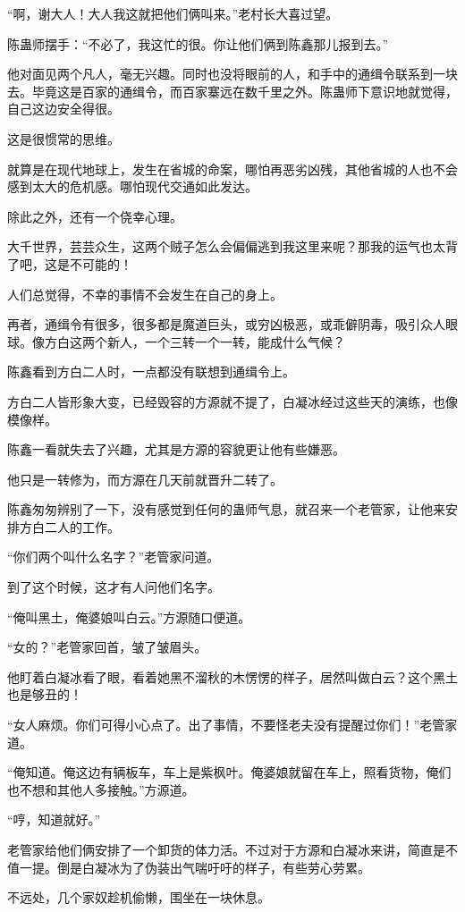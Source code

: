 \begin{this_body}
“啊，谢大人！大人我这就把他们俩叫来。”老村长大喜过望。

陈蛊师摆手：“不必了，我这忙的很。你让他们俩到陈鑫那儿报到去。”

他对面见两个凡人，毫无兴趣。同时也没将眼前的人，和手中的通缉令联系到一块去。毕竟这是百家的通缉令，而百家寨远在数千里之外。陈蛊师下意识地就觉得，自己这边安全得很。

这是很惯常的思维。

就算是在现代地球上，发生在省城的命案，哪怕再恶劣凶残，其他省城的人也不会感到太大的危机感。哪怕现代交通如此发达。

除此之外，还有一个侥幸心理。

大千世界，芸芸众生，这两个贼子怎么会偏偏逃到我这里来呢？那我的运气也太背了吧，这是不可能的！

人们总觉得，不幸的事情不会发生在自己的身上。

再者，通缉令有很多，很多都是魔道巨头，或穷凶极恶，或乖僻阴毒，吸引众人眼球。像方白这两个新人，一个三转一个一转，能成什么气候？

陈鑫看到方白二人时，一点都没有联想到通缉令上。

方白二人皆形象大变，已经毁容的方源就不提了，白凝冰经过这些天的演练，也像模像样。

陈鑫一看就失去了兴趣，尤其是方源的容貌更让他有些嫌恶。

他只是一转修为，而方源在几天前就晋升二转了。

陈鑫匆匆辨别了一下，没有感觉到任何的蛊师气息，就召来一个老管家，让他来安排方白二人的工作。

“你们两个叫什么名字？”老管家问道。

到了这个时候，这才有人问他们名字。

“俺叫黑土，俺婆娘叫白云。”方源随口便道。

“女的？”老管家回首，皱了皱眉头。

他盯着白凝冰看了眼，看着她黑不溜秋的木愣愣的样子，居然叫做白云？这个黑土也是够丑的！

“女人麻烦。你们可得小心点了。出了事情，不要怪老夫没有提醒过你们！”老管家道。

“俺知道。俺这边有辆板车，车上是紫枫叶。俺婆娘就留在车上，照看货物，俺们也不想和其他人多接触。”方源道。

“哼，知道就好。”

老管家给他们俩安排了一个卸货的体力活。不过对于方源和白凝冰来讲，简直是不值一提。倒是白凝冰为了伪装出气喘吁吁的样子，有些劳心劳累。

不远处，几个家奴趁机偷懒，围坐在一块休息。


\end{this_body}
